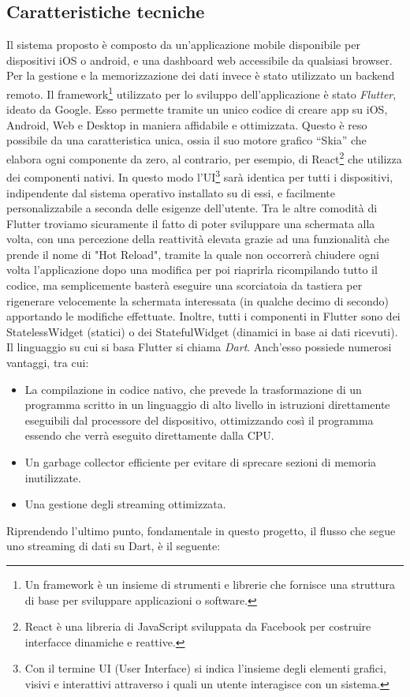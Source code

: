 \documentclass[target=bach,aauheader=,style=]{thud}
\begin{document}
\subsection{Caratteristiche tecniche}
\label{caratteristichetecniche}
Il sistema proposto è composto da un'applicazione mobile disponibile per dispositivi iOS o android, e una dashboard web accessibile da qualsiasi browser. Per la gestione e la memorizzazione dei dati invece è stato utilizzato un backend remoto. Il framework\footnote{Un framework è un insieme di strumenti e librerie che fornisce una struttura di base per sviluppare applicazioni o software.} utilizzato per lo sviluppo dell’applicazione è stato \textit{Flutter}, ideato da Google.
Esso permette tramite un unico codice di creare app su iOS, Android, Web e Desktop in maniera affidabile e ottimizzata. Questo è reso possibile da una caratteristica unica, ossia il suo motore grafico
“Skia” che elabora ogni componente da zero, al contrario, per esempio, di React\footnote{React è una libreria di JavaScript sviluppata da Facebook per costruire interfacce dinamiche e reattive.} che utilizza dei componenti nativi. 
In questo modo l’UI\footnote{Con il termine UI (User Interface) si indica l'insieme degli elementi grafici, visivi e interattivi attraverso i quali un utente interagisce con un sistema.} sarà identica per tutti i dispositivi, indipendente dal sistema operativo installato su di essi, e facilmente
personalizzabile a seconda delle esigenze dell'utente.
Tra le altre comodità di Flutter troviamo sicuramente il fatto di poter sviluppare una schermata alla volta, con una percezione della reattività elevata grazie ad una funzionalità che prende il nome di "Hot Reload", tramite la quale non occorrerà chiudere ogni volta l’applicazione dopo una modifica per poi riaprirla ricompilando tutto il
codice, ma semplicemente basterà eseguire una scorciatoia da tastiera per rigenerare velocemente la schermata interessata (in qualche decimo di secondo)
apportando le modifiche effettuate. Inoltre, tutti i componenti in Flutter sono dei StatelessWidget
(statici) o dei StatefulWidget (dinamici in base ai dati ricevuti).
Il linguaggio su cui si basa Flutter si chiama \textit{Dart}. Anch’esso possiede numerosi vantaggi, tra cui:

\begin{itemize}
    \item La compilazione in codice nativo, che prevede la trasformazione di un programma scritto in un linguaggio di alto livello in istruzioni direttamente eseguibili dal processore del dispositivo, ottimizzando così il programma essendo che verrà eseguito direttamente dalla CPU.
    \item Un garbage collector efficiente per evitare di sprecare sezioni di memoria inutilizzate.
    \item Una gestione degli streaming ottimizzata. 
\end{itemize}
Riprendendo l'ultimo punto, fondamentale in questo progetto, il flusso che segue uno streaming di dati su Dart, è il seguente:
\end{document}
